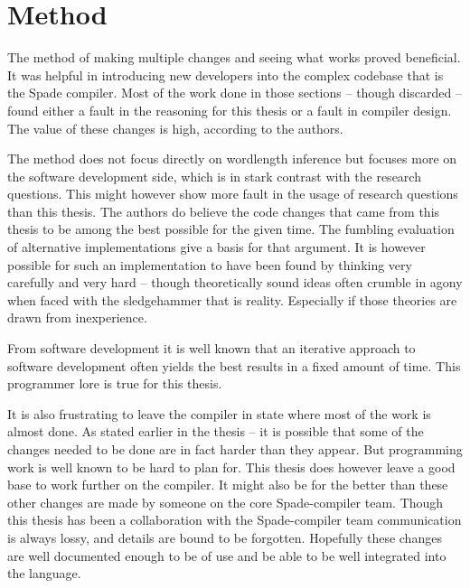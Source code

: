 
\section{Method}
The method of making multiple changes and seeing what works proved beneficial. It was helpful in introducing new developers into the complex codebase that is the Spade compiler. Most of the work done in those sections -- though discarded -- found either a fault in the reasoning for this thesis or a fault in compiler design. The value of these changes is high, according to the authors.

The method does not focus directly on wordlength inference but focuses more on the software development side, which is in stark contrast with the research questions. This might however show more fault in the usage of research questions than this thesis. The authors do believe the code changes that came from this thesis to be among the best possible for the given time. The fumbling evaluation of alternative implementations give a basis for that argument. It is however possible for such an implementation to have been found by thinking very carefully and very hard -- though theoretically sound ideas often crumble in agony when faced with the sledgehammer that is reality. Especially if those theories are drawn from inexperience.

From software development it is well known that an iterative approach to software development often yields the best results in a fixed amount of time. This programmer lore is true for this thesis.

It is also frustrating to leave the compiler in state where most of the work is almost done. As stated earlier in the thesis -- it is possible that some of the changes needed to be done are in fact harder than they appear. But programming work is well known to be hard to plan for. This thesis does however leave a good base to work further on the compiler. It might also be for the better than these other changes are made by someone on the core Spade-compiler team. Though this thesis has been a collaboration with the Spade-compiler team communication is always lossy, and details are bound to be forgotten. Hopefully these changes are well documented enough to be of use and be able to be well integrated into the language.

